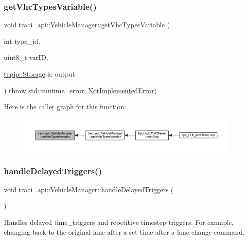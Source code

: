 \subsubsection{\texorpdfstring{get\+Vhc\+Types\+Variable()}{getVhcTypesVariable()}}
{\footnotesize\ttfamily void traci\+\_\+api\+::\+Vehicle\+Manager\+::get\+Vhc\+Types\+Variable (\begin{DoxyParamCaption}\item[{int}]{type\+\_\+id,  }\item[{uint8\+\_\+t}]{var\+ID,  }\item[{\hyperlink{classtcpip_1_1_storage}{tcpip\+::\+Storage} \&}]{output }\end{DoxyParamCaption}) throw  std\+::runtime\+\_\+error, \hyperlink{classtraci__api_1_1_not_implemented_error}{Not\+Implemented\+Error}) }

Here is the caller graph for this function\+:
\nopagebreak
\begin{figure}[H]
\begin{center}
\leavevmode
\includegraphics[width=350pt]{classtraci__api_1_1_vehicle_manager_af404c1fa8e1459cbf415d1f4931c3ad6_icgraph}
\end{center}
\end{figure}
\mbox{\label{classtraci__api_1_1_vehicle_manager_a4e656c9c9b434113e01331cf0b84babc}} 
\subsubsection{\texorpdfstring{handle\+Delayed\+Triggers()}{handleDelayedTriggers()}}
{\footnotesize\ttfamily void traci\+\_\+api\+::\+Vehicle\+Manager\+::handle\+Delayed\+Triggers (\begin{DoxyParamCaption}{ }\end{DoxyParamCaption})}



Handles delayed time\+\_\+triggers and repetitive timestep triggers. For example, changing back to the original lane after a set time after a lane change command. 

